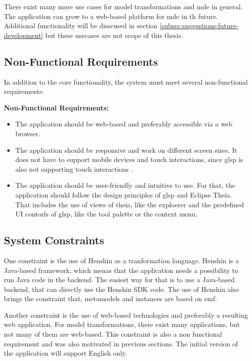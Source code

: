   There exist many more use cases for model transformations and \ac{mde} in general. The application can grow to a web-based platform for \ac{mde} in th future. Additional functionality will be disscused in section \ref{subsec:suggestions-future-development} but these usecases are not scope of this thesis.

  \subsection{Non-Functional Requirements}
  \label{subsec:non-functional-requirements}

  In addition to the core functionality, the system must meet several non-functional requirements:

  \textbf{Non-Functional Requirements:}
  \begin{itemize}
    \item The application should be web-based and preferably accessible via a web browser.
    \item The application should be responsive and work on different screen sizes. It does not have to support mobile devices and touch interactions, since \ac{glsp} is also not supporting touch interactions \cite{glsp-repo}.
    \item The application should be user-friendly and intuitive to use. For that, the application should follow the design principles of \ac{glsp} and Eclipse Theia. That includes the use of views of theia, like the exploerer and the predefined UI contorls of \ac{glsp}, like the tool palette or the context menu.
  \end{itemize}

  \subsection{System Constraints}
  \label{subsec:system-constraints}

  One constraint is the use of Henshin as a tranformation language. Henshin is a Java-based framework, which menas that the application needs a possibility to run Java code in the backend. The easiest way for that is to use a Java-based backend, that can directly use the Henshin SDK code.
  The use of Henshin also brings the constraint that, metamodels and instances are based on \ac{emf}.

  Another constraint is the use of web-based technologies and preferably a resulting web application. For model transformations, there exist many applications, but not many of them are web-based. This constraint is also a non functional requirement and was also motivated in previous sections.
  The initial version of the application will support English only.